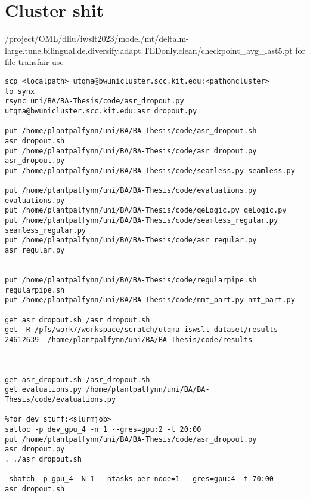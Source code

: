 \section{Cluster shit}
/project/OML/dliu/iwslt2023/model/mt/deltalm-large.tune.bilingual.de.diversify.adapt.TEDonly.clean/checkpoint_avg_last5.pt
for file transfair use
\begin{verbatim}
scp <localpath> utqma@bwunicluster.scc.kit.edu:<pathoncluster>
to synx
rsync uni/BA/BA-Thesis/code/asr_dropout.py utqma@bwunicluster.scc.kit.edu:asr_dropout.py

put /home/plantpalfynn/uni/BA/BA-Thesis/code/asr_dropout.sh asr_dropout.sh
put /home/plantpalfynn/uni/BA/BA-Thesis/code/asr_dropout.py asr_dropout.py
put /home/plantpalfynn/uni/BA/BA-Thesis/code/seamless.py seamless.py

put /home/plantpalfynn/uni/BA/BA-Thesis/code/evaluations.py evaluations.py
put /home/plantpalfynn/uni/BA/BA-Thesis/code/qeLogic.py qeLogic.py
put /home/plantpalfynn/uni/BA/BA-Thesis/code/seamless_regular.py seamless_regular.py
put /home/plantpalfynn/uni/BA/BA-Thesis/code/asr_regular.py asr_regular.py


put /home/plantpalfynn/uni/BA/BA-Thesis/code/regularpipe.sh regularpipe.sh
put /home/plantpalfynn/uni/BA/BA-Thesis/code/nmt_part.py nmt_part.py

get asr_dropout.sh /asr_dropout.sh
get -R /pfs/work7/workspace/scratch/utqma-iswslt-dataset/results-24612639  /home/plantpalfynn/uni/BA/BA-Thesis/code/results



get asr_dropout.sh /asr_dropout.sh
get evaluations.py /home/plantpalfynn/uni/BA/BA-Thesis/code/evaluations.py
 
%for dev stuff:<slurmjob>
salloc -p dev_gpu_4 -n 1 --gres=gpu:2 -t 20:00
put /home/plantpalfynn/uni/BA/BA-Thesis/code/asr_dropout.py asr_dropout.py
. ./asr_dropout.sh

 sbatch -p gpu_4 -N 1 --ntasks-per-node=1 --gres=gpu:4 -t 70:00 asr_dropout.sh

\end{verbatim}

